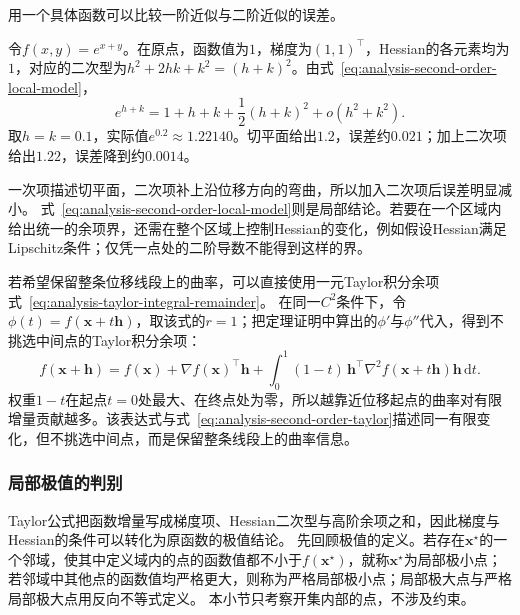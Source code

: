 用一个具体函数可以比较一阶近似与二阶近似的误差。
\begin{example}[指数函数的二阶Taylor近似]
\label{ex:multivariable-exponential-taylor}
令$f(x,y)=e^{x+y}$。在原点，函数值为$1$，梯度为$(1,1)^\top$，Hessian的各元素均为$1$，对应的二次型为$h^2+2hk+k^2=(h+k)^2$。由式~\eqref{eq:analysis-second-order-local-model}，
\[
 e^{h+k}=1+h+k+\frac12(h+k)^2+o(h^2+k^2).
\]
取$h=k=0.1$，实际值$e^{0.2}\approx1.22140$。切平面给出$1.2$，误差约$0.021$；加上二次项给出$1.22$，误差降到约$0.0014$。
\end{example}

一次项描述切平面，二次项补上沿位移方向的弯曲，所以加入二次项后误差明显减小。
式~\eqref{eq:analysis-second-order-local-model}则是局部结论。若要在一个区域内给出统一的余项界，还需在整个区域上控制Hessian的变化，例如假设Hessian满足Lipschitz条件；仅凭一点处的二阶导数不能得到这样的界。

若希望保留整条位移线段上的曲率，可以直接使用一元Taylor积分余项式~\eqref{eq:analysis-taylor-integral-remainder}。
在同一$C^2$条件下，令$\phi(t)=f(\bm x+t\bm h)$，取该式的$r=1$；把定理证明中算出的$\phi'$与$\phi''$代入，得到不挑选中间点的Taylor积分余项：
\[
 f(\bm{x}+\bm{h})
 =f(\bm{x})+\nabla f(\bm{x})^{\top}\bm{h}
 +\int_0^1(1-t)\,\bm{h}^{\top}\nabla^2f(\bm{x}+t\bm{h})\bm{h}\,\mathrm{d}t.
\]
权重$1-t$在起点$t=0$处最大、在终点处为零，所以越靠近位移起点的曲率对有限增量贡献越多。该表达式与式~\eqref{eq:analysis-second-order-taylor}描述同一有限变化，但不挑选中间点，而是保留整条线段上的曲率信息。

\subsubsection{局部极值的判别}

Taylor公式把函数增量写成梯度项、Hessian二次型与高阶余项之和，因此梯度与Hessian的条件可以转化为原函数的极值结论。
先回顾极值的定义。若存在$\bm x^\star$的一个邻域，使其中定义域内的点的函数值都不小于$f(\bm x^\star)$，就称$\bm x^\star$为局部极小点；若邻域中其他点的函数值均严格更大，则称为严格局部极小点；局部极大点与严格局部极大点用反向不等式定义。
本小节只考察开集内部的点，不涉及约束。

